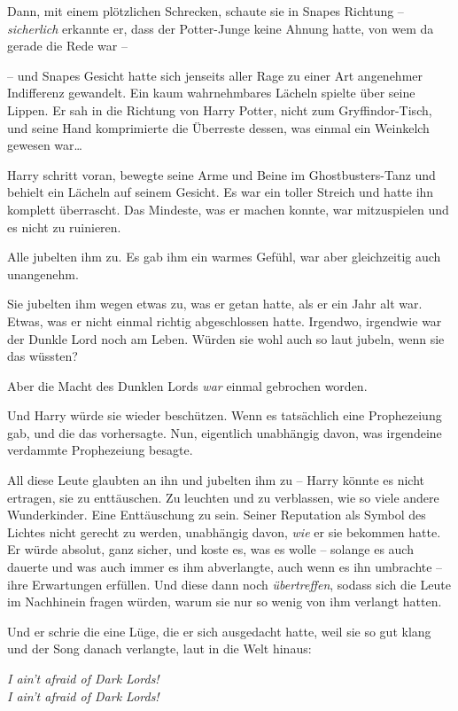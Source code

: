 Dann, mit einem plötzlichen Schrecken, schaute sie in Snapes Richtung – \emph{sicherlich} erkannte er, dass der Potter-Junge keine Ahnung hatte, von wem da gerade die Rede war –

– und Snapes Gesicht hatte sich jenseits aller Rage zu einer Art angenehmer Indifferenz gewandelt. Ein kaum wahrnehmbares Lächeln spielte über seine Lippen. Er sah in die Richtung von Harry Potter, nicht zum Gryffindor-Tisch, und seine Hand komprimierte die Überreste dessen, was einmal ein Weinkelch gewesen war…

Harry schritt voran, bewegte seine Arme und Beine im Ghostbusters-Tanz und behielt ein Lächeln auf seinem Gesicht. Es war ein toller Streich und hatte ihn komplett überrascht. Das Mindeste, was er machen konnte, war mitzuspielen und es nicht zu ruinieren.

Alle jubelten ihm zu. Es gab ihm ein warmes Gefühl, war aber gleichzeitig auch unangenehm.

Sie jubelten ihm wegen etwas zu, was er getan hatte, als er ein Jahr alt war. Etwas, was er nicht einmal richtig abgeschlossen hatte. Irgendwo, irgendwie war der Dunkle Lord noch am Leben. Würden sie wohl auch so laut jubeln, wenn sie das wüssten?

Aber die Macht des Dunklen Lords \emph{war} einmal gebrochen worden.

Und Harry würde sie wieder beschützen. Wenn es tatsächlich eine Prophezeiung gab, und die das vorhersagte. Nun, eigentlich unabhängig davon, was irgendeine verdammte Prophezeiung besagte.

All diese Leute glaubten an ihn und jubelten ihm zu – Harry könnte es nicht ertragen, sie zu enttäuschen. Zu leuchten und zu verblassen, wie so viele andere Wunderkinder. Eine Enttäuschung zu sein. Seiner Reputation als Symbol des Lichtes nicht gerecht zu werden, unabhängig davon, \emph{wie} er sie bekommen hatte. Er würde absolut, ganz sicher, und koste es, was es wolle – solange es auch dauerte und was auch immer es ihm abverlangte, auch wenn es ihn umbrachte – ihre Erwartungen erfüllen. Und diese dann noch \emph{übertreffen}, sodass sich die Leute im Nachhinein fragen würden, warum sie nur so wenig von ihm verlangt hatten.

Und er schrie die eine Lüge, die er sich ausgedacht hatte, weil sie so gut klang und der Song danach verlangte, laut in die Welt hinaus:

\begin{center}
\emph{I ain’t afraid of Dark Lords!\\
I ain’t afraid of Dark Lords!}
\end{center}

